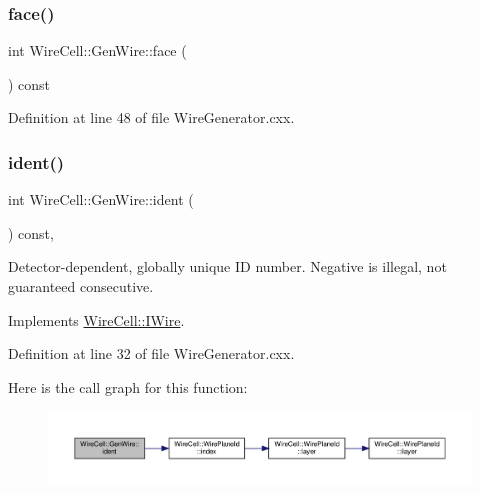 \mbox{\label{class_wire_cell_1_1_gen_wire_a7ca54f497f3e6f3690ca4f754e192427}} 
\subsubsection{\texorpdfstring{face()}{face()}}
{\footnotesize\ttfamily int Wire\+Cell\+::\+Gen\+Wire\+::face (\begin{DoxyParamCaption}{ }\end{DoxyParamCaption}) const\hspace{0.3cm}{\ttfamily [inline]}}



Definition at line 48 of file Wire\+Generator.\+cxx.

\mbox{\label{class_wire_cell_1_1_gen_wire_a5656bd4873e5160e01eea7fa923b3859}} 
\subsubsection{\texorpdfstring{ident()}{ident()}}
{\footnotesize\ttfamily int Wire\+Cell\+::\+Gen\+Wire\+::ident (\begin{DoxyParamCaption}{ }\end{DoxyParamCaption}) const\hspace{0.3cm}{\ttfamily [inline]}, {\ttfamily [virtual]}}

Detector-\/dependent, globally unique ID number. Negative is illegal, not guaranteed consecutive. 

Implements \hyperlink{class_wire_cell_1_1_i_wire_a0e188a183e202dfb6dce25f6b16fc390}{Wire\+Cell\+::\+I\+Wire}.



Definition at line 32 of file Wire\+Generator.\+cxx.

Here is the call graph for this function\+:
\nopagebreak
\begin{figure}[H]
\begin{center}
\leavevmode
\includegraphics[width=350pt]{class_wire_cell_1_1_gen_wire_a5656bd4873e5160e01eea7fa923b3859_cgraph}
\end{center}
\end{figure}
\mbox{\label{class_wire_cell_1_1_gen_wire_a9d9189545db2c32b2c2e532cea2aa82e}} 
